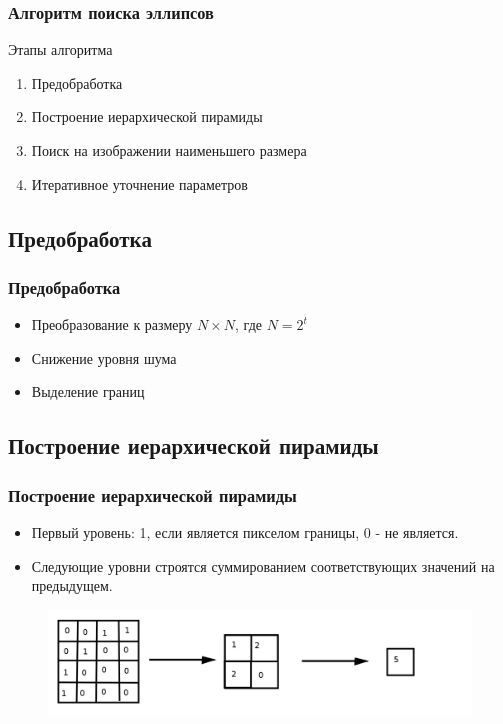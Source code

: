 \documentclass[14pt]{beamer}
\begin{document}
\begin{frame}
\frametitle{Алгоритм поиска эллипсов}
\begin{block}{Этапы алгоритма}
\begin{enumerate}
  \item Предобработка
  \item Построение иерархической пирамиды
  \item Поиск на изображении наименьшего размера
  \item Итеративное уточнение параметров
\end{enumerate}
\end{block}
\end{frame}

\subsection{Предобработка}
\begin{frame}
\frametitle{Предобработка}
\begin{block}{}
\begin{itemize}
  \item Преобразование к размеру $N \times N$, где $N = 2^t$
  \item Снижение уровня шума
  \item Выделение границ
\end{itemize}
\end{block}
\end{frame}

\subsection{Построение иерархической пирамиды}
\begin{frame}
\frametitle{Построение иерархической пирамиды}
\begin{block}{}
\begin{itemize}
  \item Первый уровень: 1, если является пикселом границы, 0 - не является.
  \item Следующие уровни строятся суммированием соответствующих значений на предыдущем.
\end{itemize}
\end{block}
\begin{figure}[H]
  \center
  \includegraphics[width=1\linewidth]{pyramidcreation}
\end{figure}
\end{frame}
\end{document}

